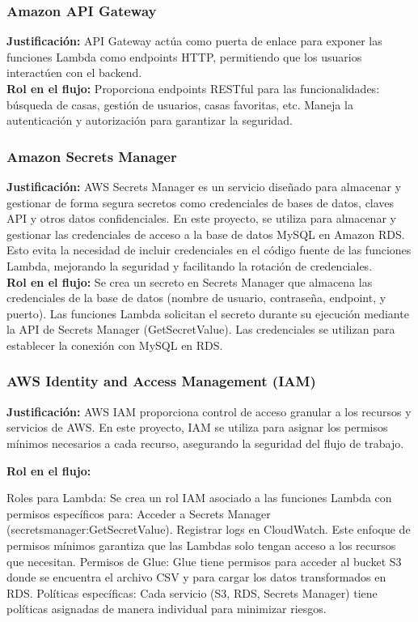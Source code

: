 \documentclass{article}
\begin{document}
\subsubsection{Amazon API Gateway}
\textbf{Justificación:}
API Gateway actúa como puerta de enlace para exponer las funciones Lambda como endpoints HTTP, permitiendo que los usuarios interactúen con el backend.\\
\textbf{Rol en el flujo:}
Proporciona endpoints RESTful para las funcionalidades: búsqueda de casas, gestión de usuarios, casas favoritas, etc.
Maneja la autenticación y autorización para garantizar la seguridad.



\subsubsection{Amazon Secrets Manager}
\textbf{Justificación:}
AWS Secrets Manager es un servicio diseñado para almacenar y gestionar de forma segura secretos como credenciales de bases de datos, claves API y otros datos confidenciales. En este proyecto, se utiliza para almacenar y gestionar las credenciales de acceso a la base de datos MySQL en Amazon RDS. Esto evita la necesidad de incluir credenciales en el código fuente de las funciones Lambda, mejorando la seguridad y facilitando la rotación de credenciales. \\

\textbf{Rol en el flujo:}
Se crea un secreto en Secrets Manager que almacena las credenciales de la base de datos (nombre de usuario, contraseña, endpoint, y puerto).
Las funciones Lambda solicitan el secreto durante su ejecución mediante la API de Secrets Manager (GetSecretValue).
Las credenciales se utilizan para establecer la conexión con MySQL en RDS.


\subsubsection{AWS Identity and Access Management (IAM)}
\textbf{Justificación:}
AWS IAM proporciona control de acceso granular a los recursos y servicios de AWS. En este proyecto, IAM se utiliza para asignar los permisos mínimos necesarios a cada recurso, asegurando la seguridad del flujo de trabajo.

\textbf{Rol en el flujo:}

Roles para Lambda:
Se crea un rol IAM asociado a las funciones Lambda con permisos específicos para:
Acceder a Secrets Manager (secretsmanager:GetSecretValue).
Registrar logs en CloudWatch.
Este enfoque de permisos mínimos garantiza que las Lambdas solo tengan acceso a los recursos que necesitan.
Permisos de Glue:
Glue tiene permisos para acceder al bucket S3 donde se encuentra el archivo CSV y para cargar los datos transformados en RDS.
Políticas específicas:
Cada servicio (S3, RDS, Secrets Manager) tiene políticas asignadas de manera individual para minimizar riesgos.
\end{document}

